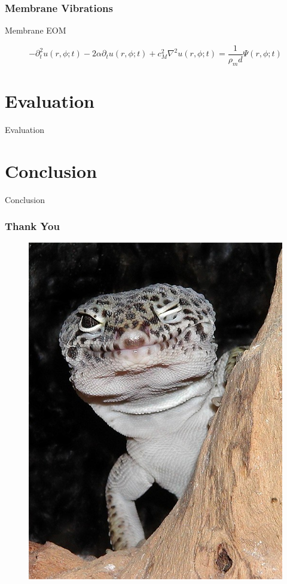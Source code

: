 \documentclass{beamer}
\begin{document}
\begin{frame}
 \frametitle{Membrane Vibrations}
\begin{exampleblock}{Membrane EOM}

\begin{equation}\label{membraneequation1}
 -\partial^2_tu(r,\phi;t)-2\alpha\partial_t u(r,\phi;t)+c^2_M\nabla^2u(r,\phi;t)
 =\frac{1}{\rho_m d}\Psi(r,\phi;t)
\end{equation}

 \end{exampleblock}

\end{frame}


\section{Evaluation}
\begin{frame}
 Evaluation
\end{frame}

\section{Conclusion}
\begin{frame}
 Conclusion
\end{frame}

\begin{frame}
 \frametitle{Thank You}
 \begin{figure}
  \centering
  \includegraphics[width=.3\textwidth]{Diagrams/geckowink.jpg}
 \end{figure}
\end{frame}
\end{document}

